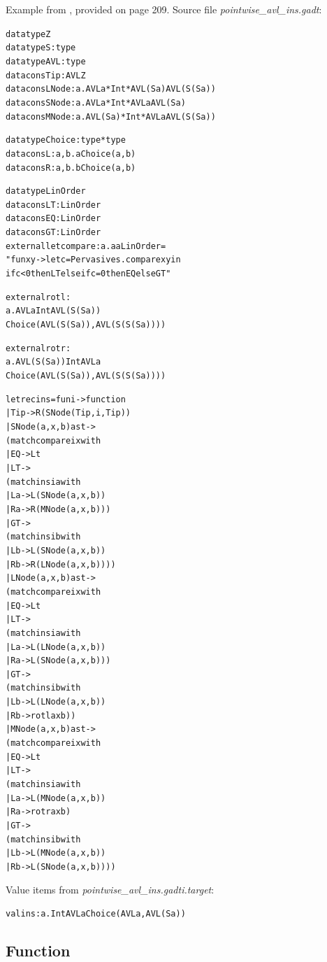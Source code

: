 \documentclass{article}
\newcommand{\tmem}[1]{{\em #1\/}}
\newcommand{\tmverbatim}[1]{{\ttfamily{#1}}}
\newenvironment{tmcode}[1][]{\begin{alltt}}{\end{alltt}}
\begin{document}
Example from {\cite{PracticalGADTsInfer}}, provided on page 209. Source file
{\tmem{pointwise\_avl\_ins.gadt}}:
\begin{tmcode}
datatype Z
datatype S : type
datatype AVL : type
datacons Tip : AVL Z
datacons LNode : a. AVL a * Int * AVL (S a)  AVL (S (S a))
datacons SNode : a. AVL a * Int * AVL a  AVL (S a)
datacons MNode : a. AVL (S a) * Int * AVL a  AVL (S (S a))

datatype Choice : type * type
datacons L : a, b. a  Choice (a, b)
datacons R : a, b. b  Choice (a, b)

datatype LinOrder
datacons LT : LinOrder
datacons EQ : LinOrder
datacons GT : LinOrder
external let compare : a. a  a  LinOrder =
  "fun x y -> let c=Pervasives.compare x y in
              if c<0 then LT else if c=0 then EQ else GT"

external rotl :
  a. AVL a  Int  AVL (S (S a)) 
    Choice (AVL (S (S a)), AVL (S (S (S a))))

external rotr :
  a. AVL (S (S a))  Int  AVL a 
    Choice (AVL (S (S a)), AVL (S (S (S a))))

let rec ins = fun i -> function
  | Tip -> R (SNode (Tip, i, Tip))
  | SNode (a, x, b) as t ->
    (match compare i x with
      | EQ -> L t
      | LT ->
        (match ins i a with
          | L a -> L (SNode (a, x, b))
          | R a -> R (MNode (a, x, b)))
      | GT ->
        (match ins i b with
          | L b -> L (SNode (a, x, b))
          | R b -> R (LNode (a, x, b))))
  | LNode (a, x, b) as t ->
    (match compare i x with
      | EQ -> L t
      | LT ->
        (match ins i a with
          | L a -> L (LNode (a, x, b))
          | R a -> L (SNode (a, x, b)))
      | GT ->
        (match ins i b with
          | L b -> L (LNode (a, x, b))
          | R b -> rotl a x b))
  | MNode (a, x, b) as t ->
    (match compare i x with
      | EQ -> L t
      | LT ->
        (match ins i a with
          | L a -> L (MNode (a, x, b))
          | R a -> rotr a x b)
      | GT ->
        (match ins i b with
          | L b -> L (MNode (a, x, b))
          | R b -> L (SNode (a, x, b))))
\end{tmcode}
Value items from {\tmem{pointwise\_avl\_ins.gadti.target}}:
\begin{tmcode}
val ins : a. Int  AVL a  Choice (AVL a, AVL (S a))
\end{tmcode}

\subsection{Function \tmverbatim{extract}}
\end{document}
